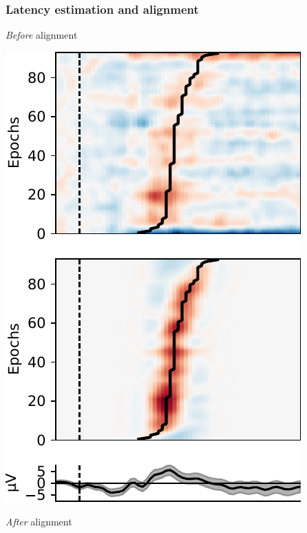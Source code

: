 \documentclass{kul-ulille-beamer}
\begin{document}
\begin{frame}
  \frametitle{Latency estimation and alignment}
  \begin{minipage}{.3\textwidth}
    \emph{Before} alignment
    \smallskip

    \includegraphics[height=1.3\textwidth]{figures/covert/split_p3_latency_subject.pdf}
  \end{minipage}
  \begin{minipage}{.3\textwidth}
    \emph{After} alignment
    \smallskip


\end{minipage}
\end{frame}
\end{document}
